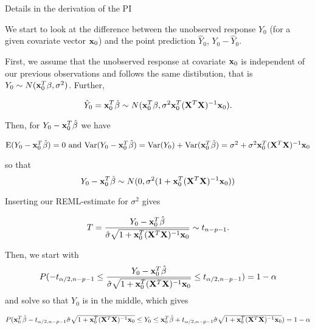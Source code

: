 \documentclass[ignorenonframetext,]{beamer}
\begin{document}
\begin{frame}

\begin{block}{Details in the derivation of the PI}

We start to look at the difference between the unobserved response
\(Y_0\) (for a given covariate vector \({\bf x}_0\)) and the point
prediction \(\hat{Y}_0\), \(Y_0-\hat{Y}_0\).

First, we assume that the unobserved response at covariate \({\bf x}_0\)
is independent of our previous observations and follows the same
distibution, that is \(Y_0 \sim N({\bf x}_0^T \beta,\sigma^2)\).
Further,

\[\hat{Y}_0={\bf x}_0^T \hat{\beta} \sim N({\bf x}_0^T \beta,\sigma^2 {\bf x}_0^T({\bf X}^T{\bf X})^{-1}{\bf x}_0).\]

Then, for \(Y_0-{\bf x}_0^T \hat{\beta}\) we have

\(\text{E}(Y_0-{\bf x}_0^T \hat{\beta})=0 \text{ and } \text{Var}(Y_0-{\bf x}_0^T \hat{\beta})=\text{Var}(Y_0)+\text{Var}({\bf x}_0^T \hat{\beta})=\sigma^2+\sigma^2{\bf x}_0^T({\bf X}^T{\bf X})^{-1}{\bf x}_0\)

so that
\[Y_0-{\bf x}_0^T \hat{\beta}\sim N(0,\sigma^2 (1+{\bf x}_0^T({\bf X}^T{\bf X})^{-1}{\bf x}_0)) \]

\end{block}

\end{frame}

\begin{frame}

Inserting our REML-estimate for \(\sigma^2\) gives

\[T=\frac{Y_0-{\bf x}_0^T \hat{\beta}}{\hat{\sigma}\sqrt{1+{\bf x}_0^T({\bf X}^T{\bf X})^{-1}{\bf x}_0}}\sim t_{n-p-1}.\]

Then, we start with
\[ P(-t_{\alpha/2,n-p-1}\le \frac{Y_0-{\bf x}_0^T \hat{\beta}}{\hat{\sigma}\sqrt{1+{\bf x}_0^T({\bf X}^T{\bf X})^{-1}{\bf x}_0}} \le t_{\alpha/2,n-p-1})=1-\alpha\]
and solve so that \(Y_0\) is in the middle, which gives

\(P({\bf x}_0^T \hat{\beta}-t_{\alpha/2,n-p-1}\hat{\sigma}\sqrt{1+{\bf x}_0^T({\bf X}^T{\bf X})^{-1}{\bf x}_0} \le Y_0 \le {\bf x}_0^T \hat{\beta}+t_{\alpha/2,n-p-1}\hat{\sigma}\sqrt{1+{\bf x}_0^T({\bf X}^T{\bf X})^{-1}{\bf x}_0})=1-\alpha\)

\end{frame}
\end{document}
